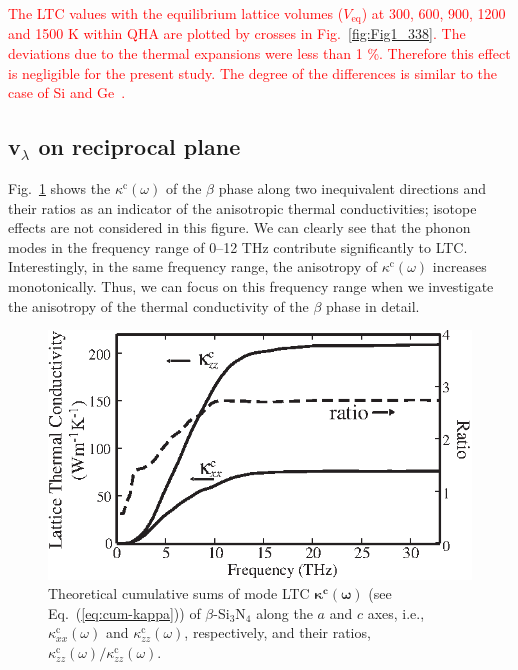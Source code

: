 \documentclass[twocolumn,amsmath,amssymb,a4paper,prb,superscriptaddress,floatfix]{revtex4-1}
\begin{document}
\textcolor{red}{The LTC values with the equilibrium lattice volumes
($V_\text{eq}$) at 300, 600, 900, 1200 and 1500 K within QHA are plotted
by crosses in Fig.~\ref{fig:Fig1_338}. The deviations due to the thermal
expansions were less than 1 \%. Therefore this effect is negligible for
the present study. The degree of the differences is similar to the case
of Si and Ge~\cite{ward-ltc}.}

\subsection{v$_\lambda$ on reciprocal plane}


Fig.~\ref{fig:Fig2_ver2_338} shows the $\kappa^\text{c}(\omega)$ of the
$\beta$ phase along two inequivalent directions and their ratios as an
indicator of the anisotropic thermal conductivities; isotope effects are
not considered in this figure. We can clearly see that the phonon modes
in the frequency range of 0--12 THz contribute significantly to
LTC. Interestingly, in the same frequency range, the anisotropy of
$\kappa^\text{c}(\omega)$ increases monotonically. Thus, we can focus on
this frequency range when we investigate the anisotropy of the thermal
conductivity of the $\beta$ phase in detail.

\begin{figure}[ht]
 \begin{center}
  \includegraphics[width=0.90\linewidth]{Fig2.eps}
  \caption{Theoretical cumulative sums of mode LTC
  $\boldsymbol{\kappa^\text{c}(\omega)}$ (see Eq.~(\ref{eq:cum-kappa})) of
  $\beta$-Si$_3$N$_4$ along the $a$ and $c$ axes, i.e.,
  $\kappa^\text{c}_{xx}(\omega)$ and $\kappa^\text{c}_{zz}(\omega)$,
  respectively, and their ratios,
  $\kappa^\text{c}_{zz}(\omega)/\kappa^\text{c}_{zz}(\omega)$.
  \label{fig:Fig2_ver2_338} }
 \end{center}
\end{figure}
\end{document}
